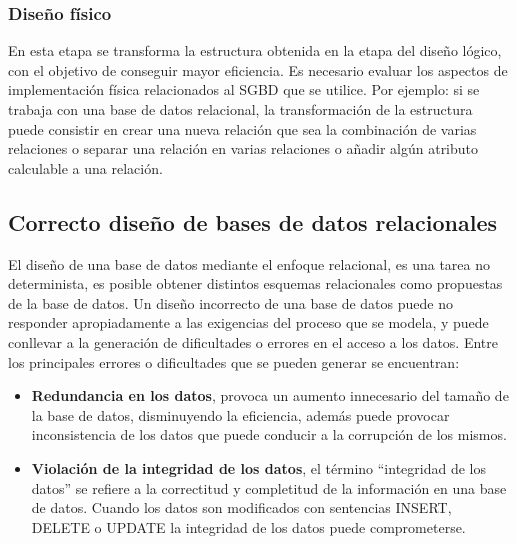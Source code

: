 
\subsubsection{Diseño físico}
En esta etapa se transforma la estructura obtenida en la etapa del diseño
lógico, con el objetivo de conseguir mayor eficiencia. Es necesario
evaluar los aspectos de implementación física relacionados al SGBD que se utilice.
Por ejemplo: si se trabaja con una base de datos relacional, la 
transformación de la estructura puede consistir en crear una nueva relación que 
sea la combinación de varias relaciones o separar una relación en varias relaciones o 
añadir algún atributo calculable a una relación. \\





\subsection{Correcto diseño de bases de datos relacionales}

El diseño de una base de datos mediante el enfoque relacional, es una 
tarea no determinista, es posible obtener distintos esquemas relacionales 
como propuestas de la base de datos.
Un diseño incorrecto de una base de datos puede no responder apropiadamente a las exigencias
del proceso que se modela, y puede conllevar a la generación de dificultades o 
errores en el acceso a los datos. Entre los principales errores o dificultades que se pueden generar
se encuentran:

\begin{itemize}
    \item \textbf{Redundancia en los datos}, provoca un aumento innecesario 
    del tamaño de la base de datos, disminuyendo la eficiencia, además puede provocar 
    inconsistencia de los datos que puede conducir a la corrupción de los mismos. 
    \item \textbf{Violación de la integridad de los datos}, el término ``integridad de los datos'' se 
    refiere a la correctitud y completitud de la información en una base de datos. Cuando los datos son 
    modificados con sentencias INSERT, DELETE o UPDATE la integridad de los datos puede comprometerse.
\end{itemize}



